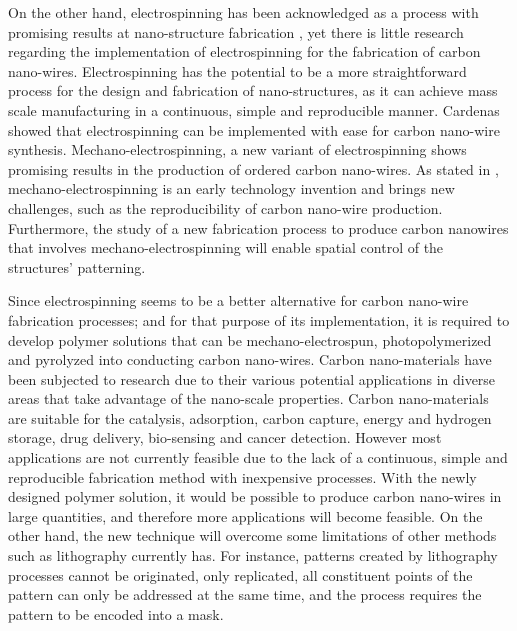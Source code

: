 On the other hand, electrospinning has been acknowledged as a process with promising results at nano-structure fabrication \cite{Boer2014}, yet there is little research regarding the implementation of electrospinning for the fabrication of carbon nano-wires. Electrospinning has the potential to be a more straightforward process for the design and fabrication of nano-structures, as it can achieve mass scale manufacturing in a continuous, simple and reproducible manner. Cardenas \cite{Cardenas2017} showed that electrospinning can be implemented with ease for carbon nano-wire synthesis. Mechano-electrospinning, a new variant of electrospinning shows promising results in the production of ordered carbon nano-wires. As stated in \cite{Cardenas2017}, mechano-electrospinning is an early technology invention and brings new challenges, such as the reproducibility of carbon nano-wire production. Furthermore, the study of a new fabrication process to produce carbon nanowires that involves mechano-electrospinning will enable spatial control of the structures' patterning.

Since electrospinning seems to be a better alternative for carbon nano-wire fabrication processes; and for that purpose of its implementation, it is required to develop polymer solutions that can be mechano-electrospun, photopolymerized and pyrolyzed into conducting carbon nano-wires. Carbon nano-materials have been subjected to research due to their various potential applications in diverse areas that take advantage of the nano-scale properties. \cite{Siddiqui2019} Carbon nano-materials are suitable for the catalysis, adsorption, carbon capture, energy and hydrogen storage, drug delivery, bio-sensing and cancer detection. \cite{Siddiqui2019} However most applications are not currently feasible due to the lack of a continuous, simple and reproducible fabrication method with inexpensive processes. With the newly designed polymer solution, it would be possible to produce carbon nano-wires in large quantities, and therefore more applications will become feasible. On the other hand, the new technique will overcome some limitations of other methods such as lithography currently has. For instance, patterns created by lithography processes cannot be originated, only replicated, all constituent points of the pattern can only be addressed at the same time, and the process requires the pattern to be encoded into a mask. \cite{Landis2011}


